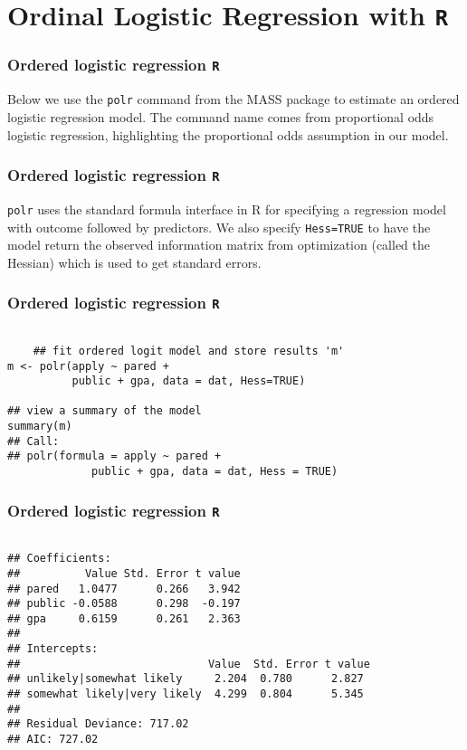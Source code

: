 \documentclass[00-GLMregslides.tex]{subfiles}
\begin{document}
\newpage
\Large

\section{Ordinal Logistic Regression with \texttt{R}}


\begin{frame}[fragile]
	\frametitle{Ordered logistic regression \texttt{R} }
	\Large

Below we use the \texttt{polr} command from the MASS package to estimate an ordered logistic regression model. The command name comes from proportional odds logistic regression, highlighting the proportional odds assumption in our model. 
\end{frame}
\begin{frame}[fragile]
	\frametitle{Ordered logistic regression \texttt{R} }
	\Large
	\texttt{polr} uses the standard formula interface in R for specifying a regression model with outcome followed by predictors. We also specify \texttt{Hess=TRUE} to have the model return the observed information matrix from optimization (called the Hessian) which is used to get standard errors.
\end{frame}
\begin{frame}[fragile]
	\frametitle{Ordered logistic regression \texttt{R} }
	\Large
\begin{framed}		
	\begin{verbatim}
	
	## fit ordered logit model and store results 'm'
m <- polr(apply ~ pared + 
          public + gpa, data = dat, Hess=TRUE)

## view a summary of the model
summary(m)
## Call:
## polr(formula = apply ~ pared + 
             public + gpa, data = dat, Hess = TRUE)
\end{verbatim}
\end{framed}
\end{frame}
\begin{frame}[fragile]
	\frametitle{Ordered logistic regression \texttt{R} }
	\Large
\begin{framed}		
	\begin{verbatim}
		
## Coefficients:
##          Value Std. Error t value
## pared   1.0477      0.266   3.942
## public -0.0588      0.298  -0.197
## gpa     0.6159      0.261   2.363
## 
## Intercepts:
##                             Value  Std. Error t value
## unlikely|somewhat likely     2.204  0.780      2.827 
## somewhat likely|very likely  4.299  0.804      5.345 
## 
## Residual Deviance: 717.02 
## AIC: 727.02
\end{verbatim}
\end{framed}
\end{frame}
\end{document}
